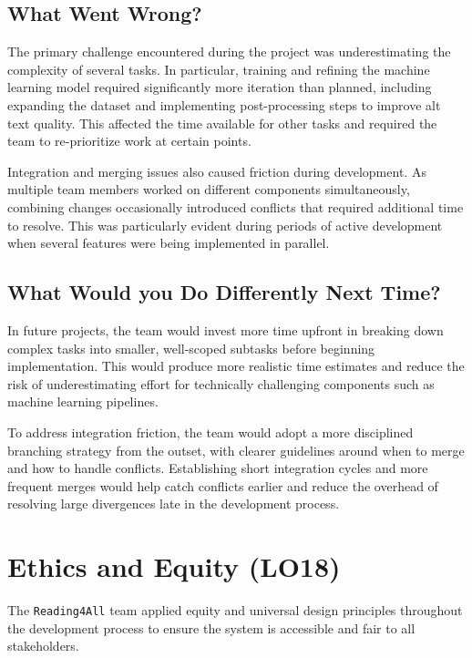 \documentclass{article}
\begin{document}
\subsection{What Went Wrong?}

The primary challenge encountered during the project was underestimating the 
complexity of several tasks. In particular, training and refining the machine learning 
model required significantly more iteration than planned, including expanding the 
dataset and implementing post-processing steps to improve alt text quality. This 
affected the time available for other tasks and required the team to re-prioritize 
work at certain points.

Integration and merging issues also caused friction during development. As multiple 
team members worked on different components simultaneously, combining changes 
occasionally introduced conflicts that required additional time to resolve. This was 
particularly evident during periods of active development when several features were 
being implemented in parallel.

\subsection{What Would you Do Differently Next Time?}

In future projects, the team would invest more time upfront in breaking down complex 
tasks into smaller, well-scoped subtasks before beginning implementation. This would 
produce more realistic time estimates and reduce the risk of underestimating effort 
for technically challenging components such as machine learning pipelines.

To address integration friction, the team would adopt a more disciplined branching 
strategy from the outset, with clearer guidelines around when to merge and how to 
handle conflicts. Establishing short integration cycles and more frequent merges 
would help catch conflicts earlier and reduce the overhead of resolving large 
divergences late in the development process.

\section{Ethics and Equity (LO18)}

The \texttt{Reading4All} team applied equity and universal design principles 
throughout the development process to ensure the system is accessible and fair to 
all stakeholders.
\end{document}
